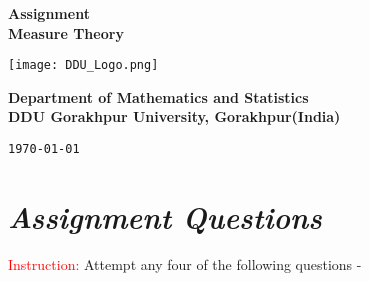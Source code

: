 \documentclass[12pt, a4paper]{article} %
\begin{document}
\begin{titlepage}
    \begin{center}
        \vspace*{1cm}

        \Large{\bf Assignment}\\ 
        \Large{\textbf{Measure Theory}}
        

        \vspace*{1cm}

        \texttt{[image: DDU\_Logo.png]}
        \vspace*{1cm}

        \begin{center}
            {\bf Department of Mathematics and Statistics\\
        DDU Gorakhpur University, Gorakhpur(India)}
        \end{center}
        
        \vfill %

        {\tt \today}\\
    \end{center}
\end{titlepage}

\tableofcontents
\thispagestyle{empty}
\clearpage

\setcounter{page}{1}


\section{\slshape Assignment Questions}

\textcolor{red}{Instruction:} \textcolor{blue!85!yellow}{Attempt any four of the following questions -}
\end{document}
